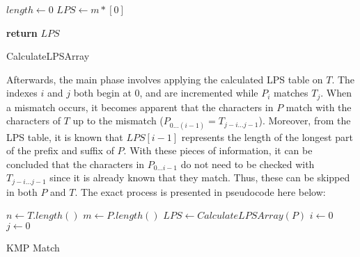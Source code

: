 \documentclass[12pt]{article}
\begin{document}
\begin{center}
\begin{singlespace}
\begin{minipage}{0.75\linewidth}
\begin{algorithm}[H]
	$length \leftarrow 0$ \;
	$LPS \leftarrow m * [0]$ \;

	\bigskip


	\textbf{return} $LPS$
	\caption{CalculateLPSArray}
\end{algorithm}
\end{minipage}
\end{singlespace}
\end{center}

Afterwards, the main phase involves applying the calculated LPS table on $T$. The
indexes $i$ and $j$ both begin at 0, and are incremented while $P_{i}$ matches $T_{j}$. When a
mismatch occurs, it becomes apparent that the characters in $P$ match with the characters
of $T$ up to the mismatch ($P_{0 \ldots (i-1)} = T_{j-i \ldots j-1}$). Moreover, from the LPS table, it is known
that $LPS[i - 1]$ represents the length of the longest part of the prefix and suffix of $P$.
With these pieces of information, it can be concluded that the characters in $P_{0 \ldots i-1}$ do
not need to be checked with $T_{j-i \ldots j-1}$ since it is already known that they match. Thus,
these can be skipped in both $P$ and $T$. The exact process is presented in pseudocode here
below:

\begin{center}
\begin{singlespace}
\begin{minipage}{0.75\linewidth}
\begin{algorithm}[H]
	$n \leftarrow T.length()$ \;
	$m \leftarrow P.length()$ \;
	$LPS \leftarrow CalculateLPSArray(P)$ \;
	$i \leftarrow 0$ \;
	$j \leftarrow 0$ \;

	\bigskip

	\caption{KMP Match}
\end{algorithm}
\end{minipage}
\end{singlespace}
\end{center}
\end{document}
